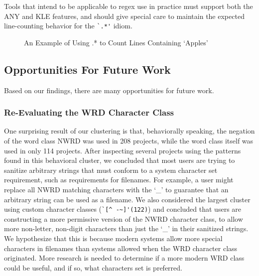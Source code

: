 Tools that intend to be applicable to regex use in practice must support both the ANY and KLE features, and should give special care to maintain the expected line-counting behavior for the \verb!`.*'! idiom.



\begin{figure}[tb]
\centering
{}
\caption{An Example of Using .* to Count Lines Containing `Apples'}
\label{fig:lineSearch}
\end{figure}


\subsection{Opportunities For Future Work}

Based on our findings, there are many opportunities for future work.

\subsubsection{Re-Evaluating the WRD Character Class}
One surprising result of our clustering is that, behaviorally speaking, the negation of the word class NWRD was used in 208 projects, while the word class itself was used in only 114 projects. After inspecting several projects using the patterns found in this behavioral cluster, we concluded that most users are trying to sanitize arbitrary strings that must conform to a system character set requirement, such as requirements for filenames.  For example, a user might replace all NWRD matching characters with the `\_' to guarantee that an arbitrary string can be used as a filename.  We also considered the largest cluster using custom character classes (\verb?`[^ -~]'(122)?) and concluded that users are constructing a more permissive version of the NWRD character class, to allow more non-letter, non-digit characters than just the `\_' in their sanitized strings.  We hypothesize that this is because modern systems allow more special characters in filenames than systems allowed when the WRD character class originated.  More research is needed to determine if a more modern WRD class could be useful, and if so, what characters set is preferred.

